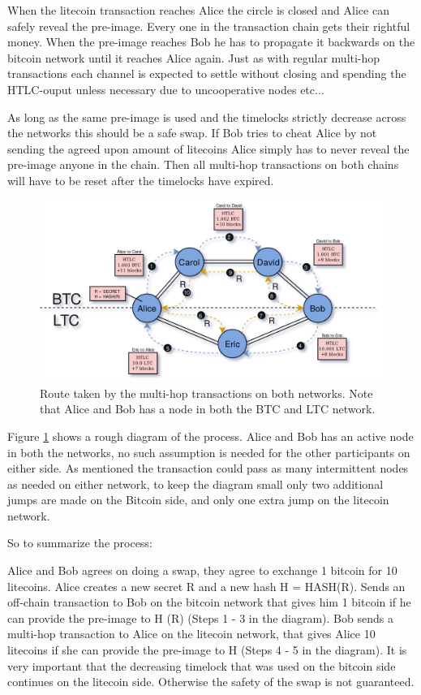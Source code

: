 When the litecoin transaction reaches Alice the circle is closed and Alice can safely reveal the pre-image. Every one in the transaction chain gets their rightful money. When the pre-image reaches Bob he has to propagate it backwards on the bitcoin network until it reaches Alice again. Just as with regular multi-hop transactions each channel is expected to settle without closing and spending the HTLC-ouput unless necessary due to uncooperative nodes etc... 

As long as the same pre-image is used and the timelocks strictly decrease across the networks this should be a safe swap. If Bob tries to cheat Alice by not sending the agreed upon amount of litecoins Alice simply has to never reveal the pre-image anyone in the chain. Then all multi-hop transactions on both chains will have to be reset after the timelocks have expired.

\begin{figure}[H]
	\centering
	\includegraphics[width=1\textwidth]{background/images/ln_route_swap.png}
	\caption{Route taken by the multi-hop transactions on both networks. Note that Alice and Bob has a node in both the BTC and LTC network.}
	\label{fig:ln-swap}
\end{figure}

Figure \ref{fig:ln-swap} shows a rough diagram of the process. Alice and Bob has an active node in both the networks, no such assumption is needed for the other participants on either side. As mentioned the transaction could pass as many intermittent nodes as needed on either network, to keep the diagram small only two additional jumps are made on the Bitcoin side, and only one extra jump on the litecoin network.  

So to summarize the process: 

Alice and Bob agrees on doing a swap, they agree to exchange 1 bitcoin for 10 litecoins. Alice creates a new secret R and a new hash H = HASH(R). Sends an off-chain transaction to Bob on the bitcoin network that gives him 1 bitcoin if he can provide the pre-image to H (R) (Steps 1 - 3 in the diagram). Bob sends a multi-hop transaction to Alice on the litecoin network, that gives Alice 10 litecoins if she can provide the pre-image to H (Steps 4 - 5 in the diagram). It is very important that the decreasing timelock that was used on the bitcoin side continues on the litecoin side. Otherwise the safety of the swap is not guaranteed. 

